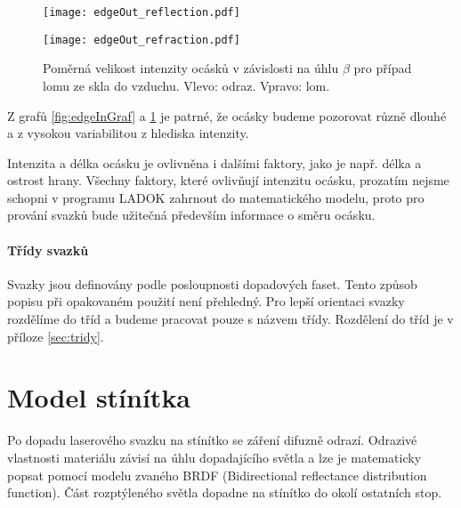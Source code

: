 \begin{figure}[h!]
\centering
\begin{minipage}[c]{0.48\textwidth}
\texttt{[image: edgeOut\_reflection.pdf]}
\end{minipage}
\begin{minipage}[c]{0.48\textwidth}
\texttt{[image: edgeOut\_refraction.pdf]}
\end{minipage}
\caption[Poměrná velikost intenzity ocásku případ lomu ze skla do vzduchu.]{Poměrná velikost intenzity ocásků v závislosti na úhlu $\beta$ pro případ lomu ze skla do vzduchu. Vlevo: odraz. Vpravo: lom.}
\label{fig:edgeOutGraf}
\end{figure}

Z grafů \ref{fig:edgeInGraf} a \ref{fig:edgeOutGraf} je patrné, že ocásky budeme pozorovat různě dlouhé a z vysokou variabilitou z hlediska intenzity. 
	  
 Intenzita a délka ocásku je ovlivněna i dalšími faktory, jako je např. délka a ostrost hrany. Všechny faktory, které ovlivňují intenzitu ocásku, prozatím nejsme schopni v programu LADOK zahrnout do matematického modelu, proto pro prování svazků bude užitečná především informace o směru ocásku. 
 
 \newpage
 \paragraph{Třídy svazků}
 \hspace{1mm}
 
 Svazky jsou definovány podle posloupnosti dopadových faset. Tento způsob popisu při opakovaném použití není přehledný.
 Pro lepší orientaci svazky rozdělíme do tříd a budeme pracovat pouze s názvem třídy. Rozdělení do tříd je v příloze \ref{sec:tridy}.


\section{Model stínítka}
\label{sec:stinitko}
Po dopadu laserového svazku na stínítko se záření difuzně odrazí. Odrazivé vlastnosti materiálu závisí na úhlu dopadajícího světla a lze je matematicky popsat pomocí modelu zvaného BRDF (Bidirectional reflectance distribution function). Část rozptýleného světla dopadne na stínítko do okolí ostatních stop. 



